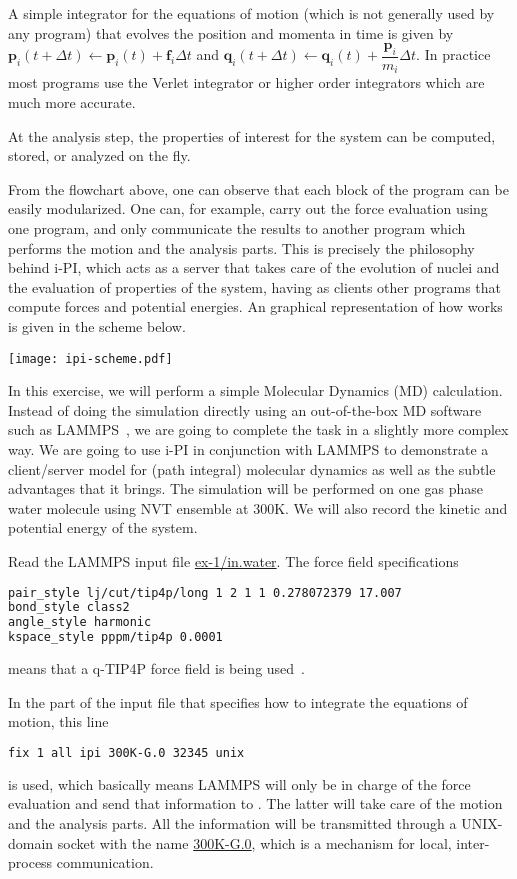 \documentclass{article}
\begin{document}
\begin{Exercise}[label={i-pi},title={Molecular Dynamics: a client/server approach}]
A simple integrator for the equations of motion (which is not generally used by any program) that
evolves the position and momenta in time is given by
$\textbf{p}_i(t+\Delta t)\leftarrow \textbf{p}_i(t)+\textbf{f}_i \Delta t$ and 
$\textbf{q}_i(t+\Delta t)\leftarrow \textbf{q}_i(t)+\dfrac{\textbf{p}_i}{m_i} \Delta t$. In practice most
programs use the Verlet integrator or higher order integrators which are much more accurate.

At the analysis step, the properties of interest for the system can be computed, stored, or analyzed on the fly.

From the flowchart above, one can observe that each block of the program can be easily modularized.
One can, for example, carry out the force evaluation using one program,
and only communicate the results to another program which performs the motion and the analysis parts.
This is precisely the philosophy behind i-PI,
which acts as a server that takes care of the evolution of nuclei and the evaluation of
properties of the system, having as clients other programs that compute forces and potential energies.
An graphical representation of how \ipi{} works is given in the scheme below.

{\centering\texttt{[image: ipi-scheme.pdf]}}

In this exercise, we will perform a simple Molecular Dynamics (MD) calculation.
Instead of doing the simulation directly using an out-of-the-box MD software such as LAMMPS~\cite{plim95jcp},
we are going to complete the task in a slightly more complex way.
We are going to use i-PI in conjunction with LAMMPS to demonstrate a client/server model 
for (path integral) molecular dynamics as well as the subtle advantages that it brings.
The simulation will be performed on one gas phase water molecule using NVT ensemble at 300K.
We will also record the kinetic and potential energy of the system.

\Question
Read the LAMMPS input file \url{ex-1/in.water}.
The force field specifications
\begin{lstlisting}[language=bash]
pair_style lj/cut/tip4p/long 1 2 1 1 0.278072379 17.007
bond_style class2 
angle_style harmonic
kspace_style pppm/tip4p 0.0001
\end{lstlisting}
means that a q-TIP4P force field is being used~\cite{habe+09jcp}.

In the part of the input file that specifies how to integrate the
equations of motion, this line
\begin{lstlisting}[language=bash]
fix 1 all ipi 300K-G.0 32345 unix
\end{lstlisting}
is used, which basically means LAMMPS will only be in charge of the 
force evaluation and send that information to \ipi{}.
The latter will take care of the motion and the analysis parts.
All the information will be transmitted through a UNIX-domain socket with the name \url{300K-G.0},
which is a mechanism for local, inter-process communication.


\end{Exercise}
\end{document}
